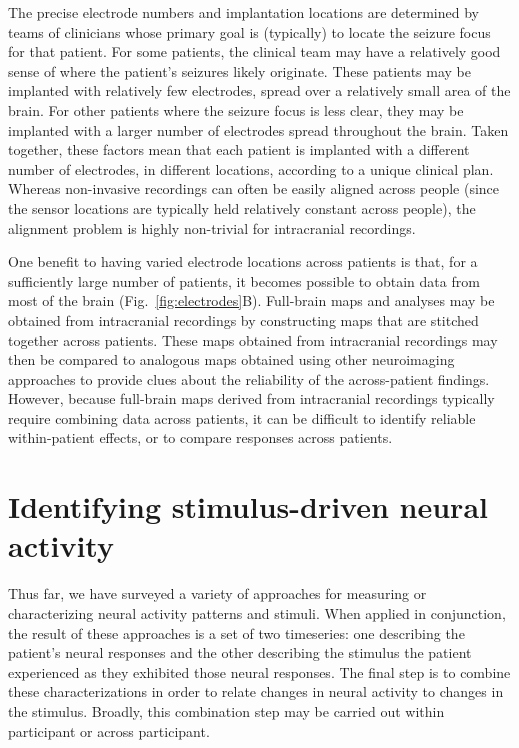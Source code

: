 \documentclass{llmxive}
\begin{document}
The precise electrode numbers and implantation locations are
determined by teams of clinicians whose primary goal is (typically) to
locate the seizure focus for that patient.  For some patients, the
clinical team may have a relatively good sense of where the patient's
seizures likely originate.  These patients may be implanted with relatively few
electrodes, spread over a relatively small area of the brain.  For
other patients where the seizure focus is less clear, they may be
implanted with a larger number of electrodes spread throughout the
brain.  Taken together, these factors mean that each patient is
implanted with a different number of electrodes, in different
locations, according to a unique clinical plan.  Whereas non-invasive
recordings can often be easily aligned across people (since the
sensor locations are typically held relatively constant across
people), the alignment problem is highly non-trivial for intracranial
recordings.

One benefit to having varied electrode locations across patients is
that, for a sufficiently large number of patients, it becomes possible
to obtain data from most of the brain (Fig.~\ref{fig:electrodes}B).
Full-brain maps and analyses may be obtained from intracranial
recordings by constructing maps that are stitched together across
patients.  These maps obtained from intracranial recordings may then
be compared to analogous maps obtained using other neuroimaging
approaches to provide clues about the reliability of the
across-patient findings.  However, because full-brain maps derived
from intracranial recordings typically require combining data across
patients, it can be difficult to identify reliable within-patient
effects, or to compare responses across patients.



\section{Identifying stimulus-driven neural activity \label{sec:linking}}
Thus far, we have surveyed a variety of approaches for measuring or
characterizing neural activity patterns and stimuli.  When applied in
conjunction, the result of these approaches is a set of two
timeseries: one describing the patient's neural responses and the other describing
the stimulus the patient experienced as they exhibited those neural
responses.  The final step is to combine these characterizations in
order to relate changes in neural activity to changes in the
stimulus.  Broadly, this combination step may be carried out
within participant or across participant.
\end{document}
